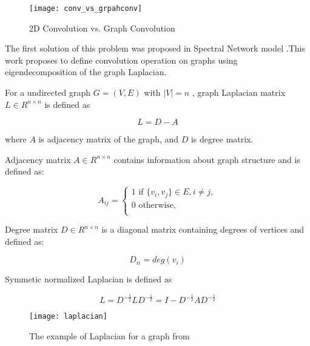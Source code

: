 \begin{figure}[t]
    \centering
    \texttt{[image: conv\_vs\_grpahconv]}
    \caption{2D Convolution vs. Graph Convolution \cite{SurveyOnGNN}}
    \label{fig:conv}
\end{figure}

The first solution of this problem was proposed in Spectral Network model \cite{Spectral}.This work proposes
to define convolution operation on graphs using eigendecomposition of the graph Laplacian.

For a undirected graph $G = (V,E)$ with $|V|=n$ , graph Laplacian matrix  $L \in R^{n \times n}$ is defined as 

\begin{equation}
    L = D - A
    \label{eq:laplacian}
 \end{equation}

where $A$ is adjacency matrix of the graph, and $D$ is degree matrix.

Adjacency matrix $A \in R^{n \times n}$ contains information about graph structure and is defined as:

\begin{equation}
    A_{ij} = 
    \begin{cases}
        1 \text{ if } \{v_i, v_j \} \in E, i \neq j,\\
        0 \text{ otherwise},\\
    \end{cases}
    \label{eq:adj}
\end{equation}

Degree matrix $D \in R^{n \times n}$ is a diagonal matrix containing degrees of vertices and defined as:

\begin{equation}
    D_{ii} = deg(v_i)
    \label{eq:deg_mat}
 \end{equation}


Symmetic normalized Laplacian is defined as 

\begin{equation}
    L = D^{-\frac{1}{2}}LD^{-\frac{1}{2}} = I - D^{-\frac{1}{2}}AD^{-\frac{1}{2}}
    \label{eq:normalized_laplacian}
 \end{equation}

\begin{figure}[t]
    \centering
    \texttt{[image: laplacian]}
    \caption{The example of Laplacian for a graph from \cite{distillGCN}}
    \label{fig:laplacian}
\end{figure}

